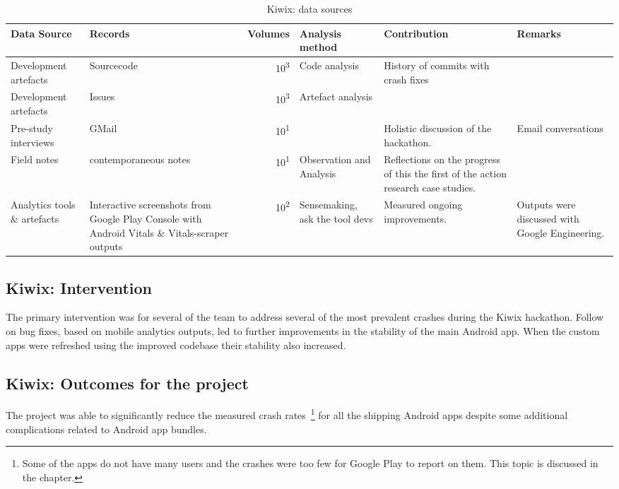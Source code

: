 \begin{table}
    \centering
    \footnotesize
    \tabcolsep=0.12cm
    \begin{tabular}{>{\raggedright}p{2.8cm}>{\raggedright}p{3.6cm}r>{\raggedright}p{2.1cm}>{\raggedright}p{2.2cm}>{\raggedright\arraybackslash}p{2.5cm}}
        Data Source & Records & Volumes & Analysis method & Contribution & Remarks \\
        \toprule
         Development artefacts & Sourcecode\footnotemark & 10\textsuperscript{3} & Code analysis & History of commits with crash fixes &  \\
         Development artefacts & Issues\footnotemark & 10\textsuperscript{3} & Artefact analysis & \\
         Pre-study interviews & GMail & 10\textsuperscript{1} & & Holistic discussion of the hackathon. & Email conversations \\
         Field notes & contemporaneous notes & 10\textsuperscript{1} & Observation and Analysis & Reflections on the progress of this the first of the action research case studies. & \\
         Analytics tools \& artefacts &Interactive screenshots from Google Play Console with Android Vitals \& Vitals-scraper outputs &10\textsuperscript{2} & Sensemaking, ask the tool devs & Measured ongoing improvements. & Outputs were discussed with Google Engineering. \\
         \bottomrule
    \end{tabular}
    \caption{Kiwix: data sources}
    \label{tab:kiwix-data-sources}
\end{table}



\subsection{Kiwix: Intervention}
The primary intervention was for several of the team to address several of the most prevalent crashes during the Kiwix hackathon. Follow on bug fixes, based on mobile analytics outputs, led to further improvements in the stability of the main Android app. When the custom apps were refreshed using the improved codebase their stability also increased.

\subsection{Kiwix: Outcomes for the project}
The project was able to significantly reduce the measured crash rates~\footnote{Some of the apps do not have many users and the crashes were too few for Google Play to report on them. This topic is discussed in the  chapter.} for all the shipping Android apps despite some additional complications related to Android app bundles. 


